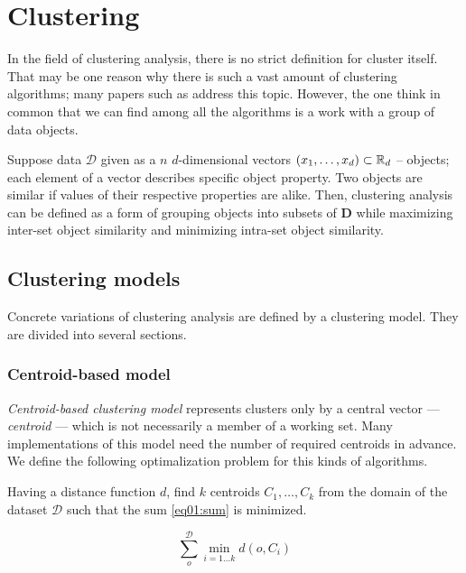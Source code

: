 \chapter{Clustering}

In the field of clustering analysis, there is no strict definition for cluster itself. That may be one reason why there is such a vast amount of clustering algorithms; many papers such as \cite{estivill2002so} address this topic.  However, the one think in common that we can find among all the algorithms is a work with a group of data objects.

Suppose data $\mathcal{D}$ given as a $n$ $d$-dimensional vectors $(x_1,\dots,x_d) \subset \mathbb{R}_d$  -- objects; each element of a vector describes specific object property. Two objects are similar if values of their respective properties are alike. Then, clustering analysis can be defined as a form of grouping objects into subsets of $\mathbf{D}$ while maximizing inter-set object similarity and minimizing intra-set object similarity.

\section{Clustering models}

Concrete variations of clustering analysis are defined by a clustering model. They are divided into several sections.

\subsection{Centroid-based model}

\emph{Centroid-based clustering model} represents clusters only by a central vector --- \emph{centroid} --- which is not necessarily a member of a working set. Many implementations of this model need the number of required centroids in advance. We define the following optimalization problem for this kinds of algorithms. 

\begin{problem}
	Having a distance function $d$, find $k$ centroids $C_1,\dots,C_k$ from the domain of the dataset $\mathcal{D}$ such that the sum \ref{eq01:sum}
	is minimized.
\end{problem}

\begin{equation}\label{eq01:sum}
	\sum_o^{\mathcal{D}} \min_{i=1\dots k}d(o,C_i)
\end{equation}

